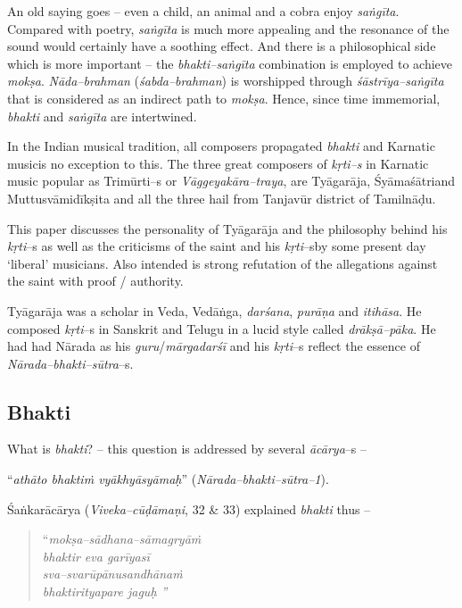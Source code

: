 An old saying goes – even a child, an animal and a cobra enjoy \textit{saṅgīta}. Compared with poetry, \textit{saṅgīta} is much more appealing and the resonance of the sound would certainly have a soothing effect. And there is a philosophical side which is more important – the \textit{bhakti–saṅgīta} combination is employed to achieve \textit{mokṣa}. \textit{Nāda–brahman} (\textit{śabda–brahman}) is worshipped through \textit{śāstrīya–saṅgīta} that is considered as an indirect path to \textit{mokṣa}. Hence, since time immemorial, \textit{bhakti} and \textit{saṅgīta} are intertwined. 

In the Indian musical tradition, all composers propagated \textit{bhakti} and Karnatic musicis no exception to this\textit{.} The three great composers of \textit{kṛti–s} in Karnatic music popular as Trimūrti–s or \textit{Vāggeyakāra–traya}, are Tyāgarāja, Śyāmaśātriand Muttusvāmidīkṣita and all the three hail from Tanjavūr district of Tamilnāḍu. 

This paper discusses the personality of Tyāgarāja and the philosophy behind his \textit{kṛti}–s as well as the criticisms of the saint and his \textit{kṛti}–s\break by some present day ‘liberal’ musicians. Also intended is strong refutation of the allegations against the saint with proof / authority.

Tyāgarāja was a scholar in Veda, Vedāṅga, \textit{darśana}, \textit{purāṇa} and \textit{itihāsa}. He composed \textit{kṛti}–s in Sanskrit and Telugu in a lucid style called \textit{drākṣā–pāka}. He had had Nārada as his \textit{guru}/\textit{mārgadarśī} and his \textit{kṛti}–s reflect the essence of \textit{Nārada–bhakti–sūtra}–s.

\subsection*{Bhakti}

What is \textit{bhakti}? – this question is addressed by several \textit{ācārya}–s – 

“\textit{athāto bhaktiṁ vyākhyāsyāmaḥ}” (\textit{Nārada–bhakti–sūtra–1}).

Śaṅkarācārya (\textit{Viveka–cūḍāmaṇi}, 32 \& 33) explained \textit{bhakti} thus –

\begin{verse}
“\textit{mokṣa–sādhana–sāmagryāṁ}\\\textit{bhaktir eva garīyasī }\\\textit{sva–svarūpānusandhānaṁ}\\\textit{bhaktirityapare jaguḥ ”}
\end{verse}

